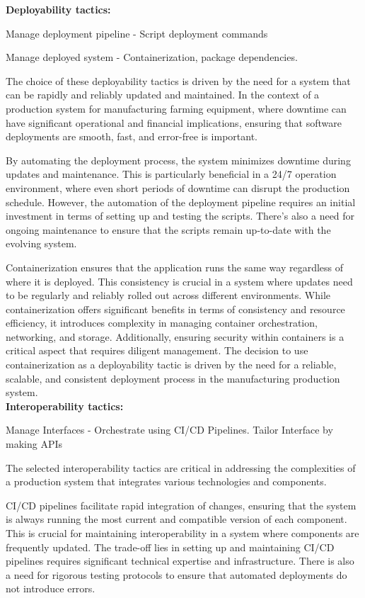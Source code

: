 \textbf{Deployability tactics:}

Manage deployment pipeline - Script deployment commands

Manage deployed system - Containerization, package dependencies.

The choice of these deployability tactics is driven by the need for a system that can be rapidly and reliably updated and maintained. In the context of a production system for manufacturing farming equipment, where downtime can have significant operational and financial implications, ensuring that software deployments are smooth, fast, and error-free is important. 

By automating the deployment process, the system minimizes downtime during updates and maintenance. This is particularly beneficial in a 24/7 operation environment, where even short periods of downtime can disrupt the production schedule. However, the automation of the deployment pipeline requires an initial investment in terms of setting up and testing the scripts. There's also a need for ongoing maintenance to ensure that the scripts remain up-to-date with the evolving system.

Containerization ensures that the application runs the same way regardless of where it is deployed. This consistency is crucial in a system where updates need to be regularly and reliably rolled out across different environments. While containerization offers significant benefits in terms of consistency and resource efficiency, it introduces complexity in managing container orchestration, networking, and storage. Additionally, ensuring security within containers is a critical aspect that requires diligent management. The decision to use containerization as a deployability tactic is driven by the need for a reliable, scalable, and consistent deployment process in the manufacturing production system.\\


\textbf{Interoperability tactics:}

Manage Interfaces - Orchestrate using CI/CD Pipelines. Tailor Interface by making APIs

The selected interoperability tactics are critical in addressing the complexities of a production system that integrates various technologies and components. 

CI/CD pipelines facilitate rapid integration of changes, ensuring that the system is always running the most current and compatible version of each component. This is crucial for maintaining interoperability in a system where components are frequently updated. The trade-off lies in setting up and maintaining CI/CD pipelines requires significant technical expertise and infrastructure. There is also a need for rigorous testing protocols to ensure that automated deployments do not introduce errors.

